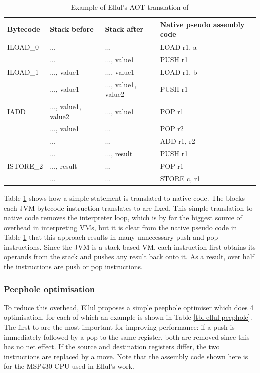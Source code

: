 \begin{table}
\caption{Example of Ellul's AOT translation of }
\label{tbl-ellul-aot-example}
    \begin{tabular}{llll} %
    \toprule
    Bytecode  & Stack before        & Stack after         & Native pseudo assembly code \\
    \midrule
    \midrule
    ILOAD\_0  & ...                 & ...                 & LOAD r1, a \\
              & ...                 & ..., value1         & PUSH r1 \\
    ILOAD\_1  & ..., value1         & ..., value1         & LOAD r1, b \\
              & ..., value1         & ..., value1, value2 & PUSH r1 \\
    IADD      & ..., value1, value2 & ..., value1         & POP r1 \\
              & ..., value1         & ...                 & POP r2 \\
              & ...                 & ...                 & ADD r1, r2 \\
              & ...                 & ..., result         & PUSH r1 \\
    ISTORE\_2 & ..., result         & ...                 & POP r1 \\
              & ...                 & ...                 & STORE c, r1 \\
    \bottomrule
    \end{tabular}
\end{table}

Table \ref{tbl-ellul-aot-example} shows how a simple statement is translated to native code. The blocks each JVM bytecode instruction translates to are fixed. This simple translation to native code removes the interpreter loop, which is by far the biggest source of overhead in interpreting VMs, but it is clear from the native pseudo code in Table \ref{tbl-ellul-aot-example} that this approach results in many unnecessary push and pop instructions. Since the JVM is a stack-based VM, each instruction first obtains its operands from the stack and pushes any result back onto it. As a result, over half the instructions are push or pop instructions.

\subsubsection{Peephole optimisation}
To reduce this overhead, Ellul proposes a simple peephole optimiser \cite{Ellul:2012thesis} which does 4 optimisation, for each of which an example is shown in Table \ref{tbl-ellul-peephole}. The first to are the most important for improving performance: if a push is immediately followed by a pop to the same register, both are removed since this has no net effect. If the source and destination registers differ, the two instructions are replaced by a move. Note that the assembly code shown here is for the MSP430 CPU used in Ellul's work.

